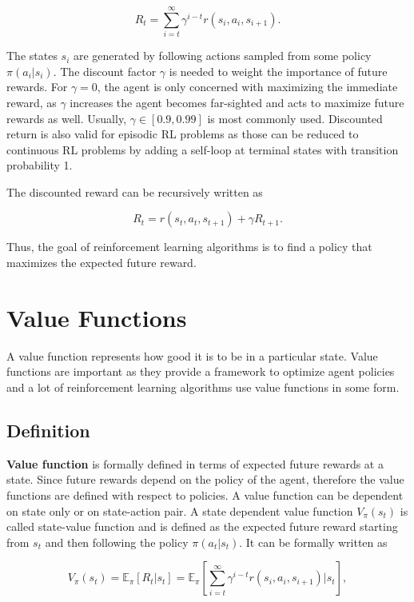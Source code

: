 \begin{equation}\label{eq:discreward}
R_t = \sum_{i=t}^\infty \gamma^{i-t}r(s_i, a_i, s_{i+1}).
\end{equation}

The states $s_i$ are generated by following actions sampled from some policy $\pi(a_i|s_i)$. The discount factor $\gamma$ is needed to weight the importance of future rewards. For $\gamma=0$, the agent is only concerned with maximizing the immediate reward, as $\gamma$ increases the agent becomes far-sighted and acts to maximize future rewards as well. Usually, $\gamma \in [0.9, 0.99]$ is most commonly used. Discounted return is also valid for episodic RL problems as those can be reduced to continuous RL problems by adding a self-loop at terminal states with transition probability 1. 

The discounted reward can be recursively written as 

\begin{equation}\label{eq:recdiscreward}
R_t = r(s_t, a_t, s_{t+1}) + \gamma R_{t+1}.
\end{equation}

Thus, the goal of reinforcement learning algorithms is to find a policy that maximizes the expected future reward.

\section{Value Functions}
A value function represents how good it is to be in a particular state. Value functions are important as they provide a framework to optimize agent policies and a lot of reinforcement learning algorithms use value functions in some form. 

\subsection{Definition}

\textbf{Value function} is formally defined in terms of expected future rewards at a state. Since future rewards depend on the policy of the agent, therefore the value functions are defined with respect to policies. A value function can be dependent on state only or on state-action pair. A state dependent value function $V_\pi(s_t)$ is called state-value function and is defined as the expected future reward starting from $s_t$ and then following the policy $\pi(a_t|s_t)$. It can be formally written as

\begin{equation}
\label{eq:vfunction}
V_\pi(s_t) = \mathbb{E}_\pi[R_t|s_t] = \mathbb{E}_\pi\left[\sum_{i=t}^\infty \gamma^{i-t}r(s_i, a_i, s_{i+1})|s_t\right],
\end{equation}

